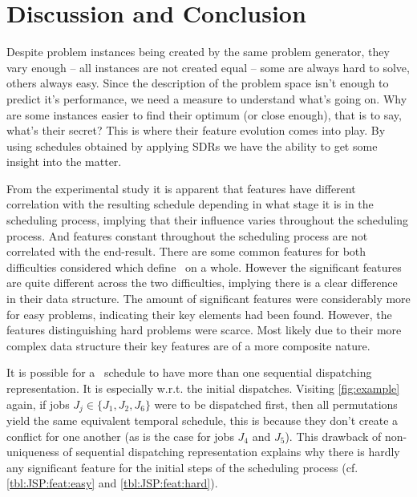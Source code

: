 \subsection{\Fmc}\label{sec:easyhard:fmc}
\subsection{\Fmxc}\label{sec:easyhard:fmxc}

\section{Discussion and Conclusion}
Despite problem instances being created by the same problem generator, they vary enough -- all instances are not created equal -- some are always hard to solve, others always easy. 
Since the description of the problem space isn't enough to predict it's performance, we need a measure to understand what's going on. Why are some instances easier to find their optimum (or close enough), that is to say, what's their secret? This is where their feature evolution comes into play.
By using schedules obtained by applying SDRs we have the ability to get some insight into the matter. 



From the experimental study it is apparent that features have different %
correlation with the resulting schedule depending in what stage it is in the scheduling process, implying that their influence varies throughout the scheduling process. And features constant throughout the scheduling process are not correlated with the end-result.
There are some common features for both difficulties considered which define \JSP\ on a whole. However the significant features are quite different across the two difficulties, implying there is a clear difference in their data structure. The amount of significant features were considerably more for easy problems, indicating their key elements had been found. However, the features distinguishing hard problems were scarce. Most likely due to their more complex data structure their key features are of a more composite nature.

It is possible for a \JSP\ schedule to have more than one sequential dispatching representation. It is especially w.r.t. the initial dispatches. Visiting \cref{fig:example} again, if jobs $J_j\in\{J_1,J_2,J_6\}$ were to be dispatched first, then all permutations yield the same equivalent temporal schedule, this is because they don't create a conflict for one another (as is the case for jobs $J_4$ and $J_5$). This drawback of non-uniqueness of sequential dispatching representation explains why there is hardly any significant feature for the initial steps of the scheduling process (cf. \cref{tbl:JSP:feat:easy} and \cref{tbl:JSP:feat:hard}). 

